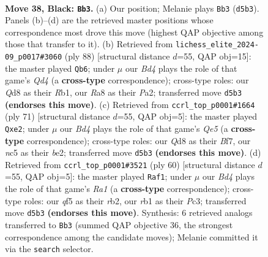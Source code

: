 \documentclass[11pt]{article}
\begin{document}
\clearpage

\begin{figure}[p]\centering
\begin{subfigure}{0.46\textwidth}\centering
\resizebox{\linewidth}{!}{%
\newchessgame
\chessboard[
  setfen={rk1q2r1/p4p1p/2p5/2Nb1Q2/3P4/6PP/5P2/1R4K1 b - - 8 38},
  showmover=false,
  pgfstyle=straightmove, color=movearrow, markmove={d5-b3}
]}
\caption{}
\end{subfigure}\hfill
\begin{subfigure}{0.46\textwidth}\centering
\resizebox{\linewidth}{!}{%
\newchessgame
\chessboard[
  setfen={3r1k2/2q2pp1/p4n1p/3P4/2PQ4/3B3P/P5P1/1R4K1 w - - 6 45},
  showmover=false,
  pgfstyle=straightmove, color=movearrow, markmove={d4-b6}
]}
\caption{}
\end{subfigure}
\\[4pt]
\begin{subfigure}{0.46\textwidth}\centering
\resizebox{\linewidth}{!}{%
\newchessgame
\chessboard[
  setfen={4r1k1/5b2/2p5/2Q3pp/4qp2/P7/1P2BPP1/3R2K1 b - - 0 36},
  showmover=false,
  pgfstyle=straightmove, color=movearrow, markmove={e4-e2}
]}
\caption{}
\end{subfigure}\hfill
\begin{subfigure}{0.46\textwidth}\centering
\resizebox{\linewidth}{!}{%
\newchessgame
\chessboard[
  setfen={5rk1/5p2/2qP2pP/p2pP1Qn/8/2P1B2K/1r6/R6R w - - 0 31},
  showmover=false,
  pgfstyle=straightmove, color=movearrow, markmove={a1-f1}
]}
\caption{}
\end{subfigure}
\caption{\textbf{Move 38, Black: \texttt{Bb3}.} (a) Our position; Melanie plays \texttt{Bb3} (\texttt{d5b3}). Panels (b)--(d) are the retrieved master positions whose correspondence most drove this move (highest QAP objective among those that transfer to it). (b) Retrieved from \texttt{lichess\_elite\_2024-09\_p0017\#3060} (ply 88) [structural distance $d$=55, QAP obj=15]: the master played \texttt{Qb6}; under $\mu$ our \emph{Bd4} plays the role of that game's \emph{Qd4} (a \textbf{cross-type} correspondence); cross-type roles: our \emph{Q}d8 as their \emph{R}b1, our \emph{R}a8 as their \emph{P}a2; transferred move \texttt{d5b3} \textbf{(endorses this move)}. (c) Retrieved from \texttt{ccrl\_top\_p0001\#1664} (ply 71) [structural distance $d$=55, QAP obj=5]: the master played \texttt{Qxe2}; under $\mu$ our \emph{Bd4} plays the role of that game's \emph{Qe5} (a \textbf{cross-type} correspondence); cross-type roles: our \emph{Q}d8 as their \emph{B}f7, our \emph{n}c5 as their \emph{b}e2; transferred move \texttt{d5b3} \textbf{(endorses this move)}. (d) Retrieved from \texttt{ccrl\_top\_p0001\#3521} (ply 60) [structural distance $d$=55, QAP obj=5]: the master played \texttt{Raf1}; under $\mu$ our \emph{Bd4} plays the role of that game's \emph{Ra1} (a \textbf{cross-type} correspondence); cross-type roles: our \emph{q}f5 as their \emph{r}b2, our \emph{r}b1 as their \emph{P}c3; transferred move \texttt{d5b3} \textbf{(endorses this move)}. Synthesis: 6 retrieved analogs transferred to \texttt{Bb3} (summed QAP objective 36, the strongest correspondence among the candidate moves); Melanie committed it via the \texttt{search} selector.}
\label{fig:thought-m75}
\end{figure}
\end{document}
